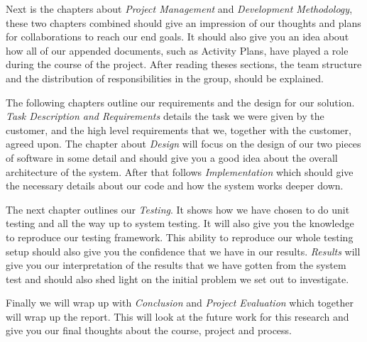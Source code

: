     Next is the chapters about \emph{Project Management} and \emph{Development Methodology}, these two chapters combined should give an impression of our thoughts and plans for collaborations to reach our end goals. It should also give you an idea about how all of our appended documents, such as Activity Plans, have played a role during the course of the project. After reading theses sections, the team structure and the distribution of responsibilities in the group, should be explained.
    
    The following chapters outline our requirements and the design for our solution. \emph{Task Description and Requirements} details the task we were given by the customer, and the high level requirements that we, together with the customer, agreed upon. The chapter about \emph{Design} will focus on the design of our two pieces of software in some detail and should give you a good idea about the overall architecture of the system. After that follows \emph{Implementation} which should give the necessary details about our code and how the system works deeper down.
    
    The next chapter outlines our \emph{Testing}. It shows how we have chosen to do unit testing and all the way up to system testing. It will also give you the knowledge to reproduce our testing framework. This ability to reproduce our whole testing setup should also give you the confidence that we have in our results. \emph{Results} will give you our interpretation of the results that we have gotten from the system test and should also shed light on the initial problem we set out to investigate.
    
    Finally we will wrap up with \emph{Conclusion} and \emph{Project Evaluation} which together will wrap up the report. This will look at the future work for this research and give you our final thoughts about the course, project and process.
    
    
